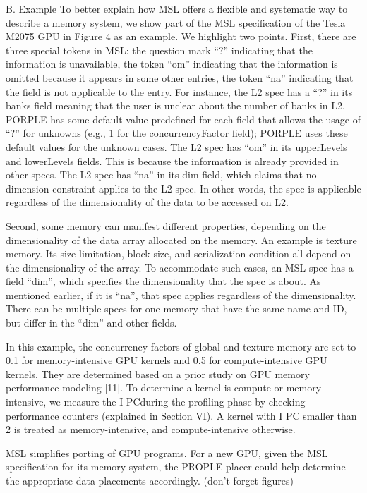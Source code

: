 \documentclass{sig-alternate}
\begin{document}
{B. Example
To better explain how MSL offers a flexible and systematic way to describe a memory system, we show part of the MSL specification of the Tesla M2075 GPU in Figure 4 as an example. We highlight two points. First, there are three special tokens in MSL: the question mark “?” indicating that the information is unavailable, the token “om” indicating that the information is omitted because it appears in some other entries, the token “na” indicating that the field is not applicable to the entry. For instance, the L2 spec has a “?” in its banks field meaning that the user is unclear about the number of banks in L2. PORPLE has some default value predefined for each field that allows the usage of “?” for unknowns (e.g., 1 for the concurrencyFactor field); PORPLE uses these default values for the unknown cases. The L2 spec has “om” in its upperLevels and lowerLevels fields. This is because the information is already provided in other specs. The L2 spec has “na” in its dim field, which claims that no dimension constraint applies to the L2 spec. In other words, the spec is applicable regardless of the dimensionality of the data to be accessed on L2.

Second, some memory can manifest different properties, depending on the dimensionality of the data array allocated on the memory. An example is texture memory. Its size limitation, block size, and serialization condition all depend on the dimensionality of the array. To accommodate such cases, an MSL spec has a field “dim”, which specifies the dimensionality that the spec is about. As mentioned earlier, if it is “na”, that spec applies regardless of the dimensionality. There can be multiple specs for one memory that have the same name and ID, but differ in the “dim” and other fields.

In this example, the concurrency factors of global and texture memory are set to 0.1 for memory-intensive GPU kernels and 0.5 for compute-intensive GPU kernels. They are determined based on a prior study on GPU memory performance modeling [11]. To determine a kernel is compute or memory intensive, we measure the I PCduring the profiling phase by checking performance counters (explained in Section VI). A kernel with I PC smaller than 2 is treated as memory-intensive, and compute-intensive otherwise.

MSL simplifies porting of GPU programs. For a new GPU, given the MSL specification for its memory system, the PROPLE placer could help determine the appropriate data placements accordingly. 
(don't forget figures)

}
\end{document}
